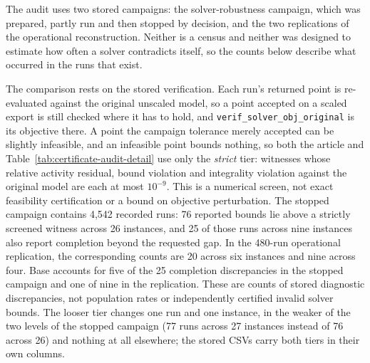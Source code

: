 \documentclass[11pt]{article}
\begin{document}
The audit uses two stored campaigns: the solver-robustness campaign,
which was prepared, partly run and then stopped by decision, and the two replications of the
operational reconstruction. Neither is a census and neither was designed to estimate how often a
solver contradicts itself, so the counts below describe what occurred in the runs that exist.

The comparison rests on the stored verification. Each run's returned point is re-evaluated
against the original unscaled model, so a point accepted on a scaled export is still checked
where it has to hold, and \texttt{verif\_solver\_obj\_original} is its objective there. A point
the campaign tolerance merely accepted can be slightly infeasible, and an infeasible point
bounds nothing, so both the article and Table~\ref{tab:certificate-audit-detail} use only the
\emph{strict} tier: witnesses whose relative activity residual, bound violation and integrality
violation against the original model are each at most $10^{-9}$. This is a numerical
screen, not exact feasibility certification or a bound on objective perturbation.
The stopped campaign contains 4,542 recorded runs: 76 reported bounds lie above a
strictly screened witness across 26 instances, and 25 of those runs across nine instances
also report completion beyond the requested gap. In the 480-run operational replication,
the corresponding counts are 20 across six instances and nine across four. Base accounts
for five of the 25 completion discrepancies in the stopped campaign and one of nine in
the replication. These are counts of stored diagnostic discrepancies, not population rates
or independently certified invalid solver bounds.
The looser tier changes one
run and one instance, in the weaker of the two levels of the stopped campaign (77 runs across 27
instances instead of 76 across 26) and nothing at all elsewhere; the stored CSVs carry both
tiers in their own columns.

\begin{table}[htb]
\centering\small
\caption{Cross-run certificate audit by level and policy. ``Dual bound'' counts runs whose
reported bound lies above a numerically screened point of the same model; ``Certificate'' counts the subset
that also reported completion further from that point than the requested gap. Runs and
instances are the totals of that level.}
\label{tab:certificate-audit-detail}

\end{table}
\end{document}
